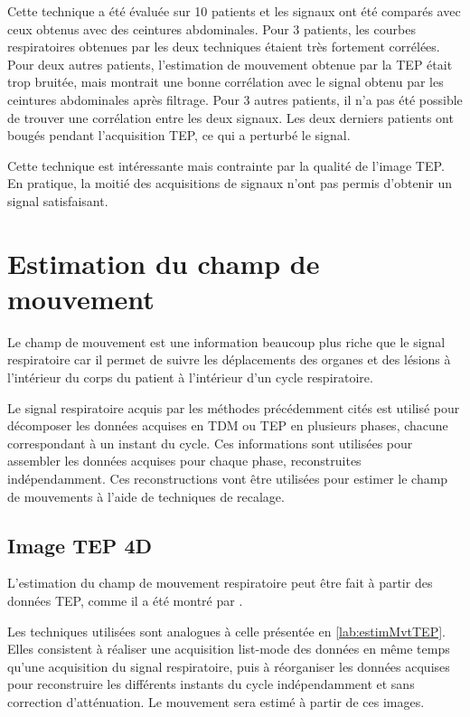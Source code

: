Cette technique a été évaluée sur 10 patients et les signaux ont été comparés avec ceux obtenus avec des ceintures abdominales. Pour 3 patients, les courbes respiratoires obtenues par les deux techniques étaient très fortement corrélées. Pour deux autres patients, l'estimation de mouvement obtenue par la TEP était trop bruitée, mais montrait une bonne corrélation avec le signal obtenu par les ceintures abdominales après filtrage. Pour 3 autres patients, il n'a pas été possible de trouver une corrélation entre les deux signaux. Les deux derniers patients ont bougés pendant l'acquisition TEP, ce qui a perturbé le signal.

Cette technique est intéressante mais contrainte par la qualité de l'image TEP. En pratique, la moitié des acquisitions de signaux n'ont pas permis d'obtenir un signal satisfaisant.


\section{Estimation du champ de mouvement}
\label{lab:estimChamp}
Le champ de mouvement est une information beaucoup plus riche que le signal respiratoire car il permet de suivre les déplacements des organes et des lésions à l'intérieur du corps du patient à l'intérieur d'un cycle respiratoire.

Le signal respiratoire acquis par les méthodes précédemment cités est utilisé pour décomposer les données acquises en TDM ou TEP en plusieurs phases, chacune correspondant à un instant du cycle. Ces informations sont utilisées pour assembler les données acquises pour chaque phase, reconstruites indépendamment. Ces reconstructions vont être utilisées pour estimer le champ de mouvements à l'aide de techniques de recalage.


\subsection{Image TEP 4D}

L'estimation du champ de mouvement respiratoire peut être fait à partir des données TEP, comme il a été montré par \cite{dawood2008respiratory, dawood2006lung}. 

Les techniques utilisées sont analogues à celle présentée en \ref{lab:estimMvtTEP}. Elles consistent à réaliser une acquisition list-mode des données en même temps qu'une acquisition du signal respiratoire, puis à réorganiser les données acquises pour reconstruire les différents instants du cycle indépendamment et sans correction d'atténuation. Le mouvement sera estimé à partir de ces images.

